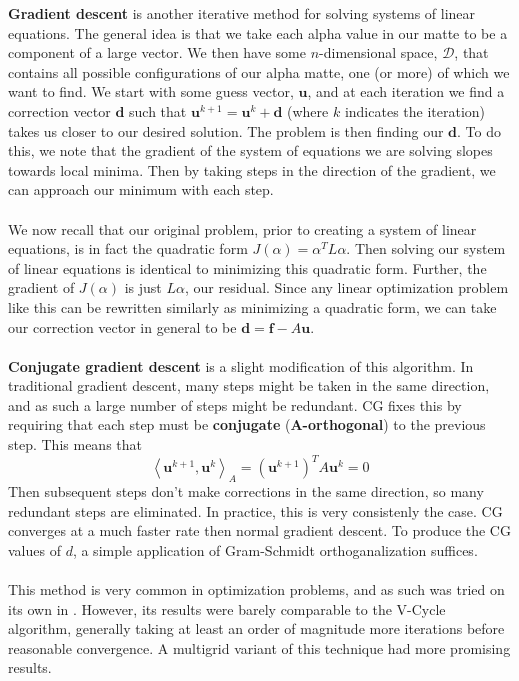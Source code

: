 \textbf{Gradient descent} is another iterative method for solving systems of linear equations. The general idea is that we take each alpha value in our matte to be a component of a large vector. We then have some $n$-dimensional space, $\mathcal{D}$, that contains all possible configurations of our alpha matte, one (or more) of which we want to find. We start with some guess vector, $\textbf{u}$, and at each iteration we find a correction vector $\textbf{d}$ such that $\textbf{u}^{k+1} = \textbf{u}^k+\textbf{d}$ (where $k$ indicates the iteration) takes us closer to our desired solution. The problem is then finding our $\textbf{d}$. To do this, we note that the gradient of the system of equations we are solving slopes towards local minima. Then by taking steps in the direction of the gradient, we can approach our minimum with each step.
\\\\
We now recall that our original problem, prior to creating a system of linear equations, is in fact the quadratic form $J(\alpha)=\alpha^TL\alpha$. Then solving our system of linear equations is identical to minimizing this quadratic form. Further, the gradient of $J(\alpha)$ is just $L\alpha$, our residual. Since any linear optimization problem like this can be rewritten similarly as minimizing a quadratic form, we can take our correction vector in general to be $\textbf{d}=\textbf{f}-A\textbf{u}$.
\\\\
\textbf{Conjugate gradient descent} is a slight modification of this algorithm. In traditional gradient descent, many steps might be taken in the same direction, and as such a large number of steps might be redundant. CG fixes this by requiring that each step must be \textbf{conjugate} (\textbf{A-orthogonal}) to the previous step. This means that
\[\left\langle \textbf{u}^{k+1},\textbf{u}^k\right\rangle_A = \left(\textbf{u}^{k+1}\right)^TA\textbf{u}^k=0\]
Then subsequent steps don't make corrections in the same direction, so many redundant steps are eliminated. In practice, this is very consistenly the case. CG converges at a much faster rate then normal gradient descent. To produce the CG values of $d$, a simple application of Gram-Schmidt orthoganalization suffices.
\\\\
This method is very common in optimization problems, and as such was tried on its own in \cite{lee14}. However, its results were barely comparable to the V-Cycle algorithm, generally taking at least an order of magnitude more iterations before reasonable convergence. A multigrid variant of this technique had more promising results.